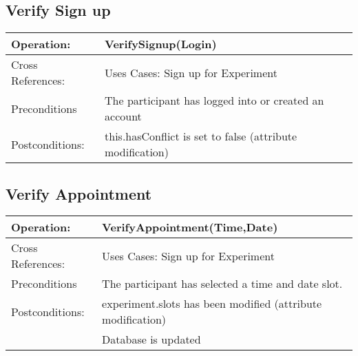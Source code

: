 \subsection{Verify Sign up}
\begin{tabular}{|l|l|}
\hline Operation: & VerifySignup(Login) \\ 
\hline Cross References: & Uses Cases: Sign up for Experiment \\ 
\hline Preconditions & The participant has logged into or created an account \\ 
\hline Postconditions: & this.hasConflict is set to false (attribute modification) \\
\hline 
\end{tabular}

\subsection{Verify Appointment}
\begin{tabular}{|l|l|}
\hline Operation: & VerifyAppointment(Time,Date) \\ 
\hline Cross References: & Uses Cases: Sign up for Experiment \\ 
\hline Preconditions & The participant has selected a time and date slot. \\ 
\hline Postconditions: & experiment.slots has been modified (attribute modification) \\
\hline & Database is updated \\
\hline 
\end{tabular}
